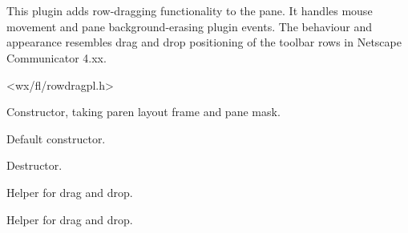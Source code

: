 %
%


\section{}\label{cbrowdragplugin}


This plugin adds row-dragging functionality to the pane.
It handles mouse movement and pane background-erasing plugin events.
The behaviour and appearance resembles drag and drop positioning
of the toolbar rows in Netscape Communicator 4.xx.




<wx/fl/rowdragpl.h>




\label{cbrowdragplugincbrowdragplugin}


Constructor, taking paren layout frame and pane mask.



Default constructor.


\label{cbrowdragplugindtor}


Destructor.


\label{cbrowdragplugincapturedcarea}


Helper for drag and drop.


\label{cbrowdragplugincheckpreviteminfocus}


Helper for drag and drop.


\label{cbrowdragpluginclone}

